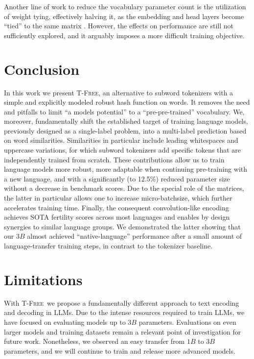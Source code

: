 \documentclass[11pt]{article}
\newcommand{\method}{\textsc{T-Free}}
\begin{document}
Another line of work to reduce the vocabulary parameter count is the utilization of weight tying, effectively halving it, as  the embedding and head layers become ``tied'' to the same matrix  \cite{press2017using}. 
However, the effects on performance are still not sufficiently explored, and it arguably imposes a more difficult training objective. 

\section{Conclusion}
\label{sec:conclusion}
In this work we present \method, an alternative to subword tokenizers with a simple and explicitly modeled robust hash function on words. It removes the need and pitfalls to limit ``a models potential'' to a ``pre-pre-trained'' vocabulary.
We, moreover, fundamentally shift the established target of training language models, previously designed as a single-label problem, into a multi-label prediction based on word similarities.
Similarities in particular include leading whitespaces and uppercase variations, for which subword tokenizers add specific tokens that are independently trained from scratch.
These contributions allow us to train language models more robust, more adaptable when continuing pre-training with a new language, and with a significantly (to 12.5\%) reduced parameter size without a decrease in benchmark scores. Due to the special role of the matrices, the latter in particular allows one to increase micro-batchsize, which further accelerates training time.
Finally, the consequent convolution-like encoding achieves SOTA fertility scores across most languages and enables by design synergies to similar language groups.
We demonstrated the latter showing that our $3B$ almost achieved ``native-language'' performance after a small amount of language-transfer training steps, in contrast to the tokenizer baseline.

\section*{Limitations}

With \method\ we propose a fundamentally different approach to text encoding and decoding in LLMs.
Due to the intense resources required to train LLMs, we have focused on evaluating models up to $3B$ parameters. Evaluations on even larger models and training datasets remain a relevant point of investigation for future work. Nonetheless, we observed an easy transfer from $1B$ to $3B$ parameters, and we will continue to train and release more advanced models.
\end{document}
